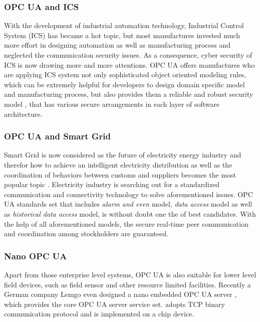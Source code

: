 \subsubsection{OPC UA and ICS}
With the development of industrial automation technology, Industrial Control System (ICS) has became a hot topic, but most manufactures invested much more effort in designing automation as well as manufacturing process and neglected the communication security issues. As a consequence, cyber security of ICS is now drawing more and more attentions. OPC UA offers manufactures who are applying ICS system not only sophisticated object oriented modeling rules, which can be extremely helpful for developers to design domain specific model and manufacturing process, but also provides them a reliable and robust security model \cite{opc_ics}, that has various secure arrangements in each layer of software architecture.


\subsubsection{OPC UA and Smart Grid}
Smart Grid is now considered as the future of electricity energy industry and therefor how to achieve an intelligent electricity distribution as well as the coordination of behaviors between customs and suppliers becomes the most popular topic \cite{opc_grid}. Electricity industry is searching out for a standardized communication and connectivity technology to solve aforementioned issues.
OPC UA standards set that includes \emph{alarm and even} model, \emph{data access} model as well as  \emph{historical data access} model, is without doubt one the of best candidates. With the help of all aforementioned models, the secure real-time peer communication and coordination among stockholders are guaranteed.

\subsubsection{Nano OPC UA }
Apart from those enterprise level systems, OPC UA is also suitable for lower level field devices, such as field sensor and other resource limited facilities. Recently a German company Lemgo even designed a nano embedded OPC UA server \cite{opc_lemgo}, which provides the core OPC UA server service set. adopts TCP binary communication protocol and is implemented on a chip device.

